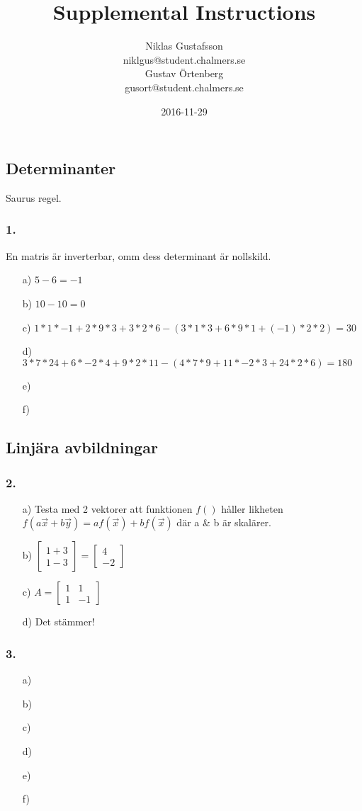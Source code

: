 \documentclass{article}
\title{Supplemental Instructions}
\author{Niklas Gustafsson \\ 
		\small{niklgus@student.chalmers.se} \\
		Gustav Örtenberg \\ 
		\small{gusort@student.chalmers.se}
}
\date{
      2016-11-29
     }
\begin{document}
\maketitle

\subsection*{Determinanter}
Saurus regel.
\subsubsection*{1.}
En matris är inverterbar, omm dess determinant är nollskild.
\begin{itemize}
	\item[a) ] $5-6=-1$
	\item[b) ] $10-10=0$
	\item[c) ] $1*1*-1+2*9*3+3*2*6-(3*1*3+6*9*1+(-1)*2*2)=30$
	\item[d) ] $3*7*24+6*-2*4+9*2*11-(4*7*9+11*-2*3+24*2*6)=180$
	\item[e) ] $  $
	\item[f) ] $  $
\end{itemize}

\subsection*{Linjära avbildningar}
\subsubsection*{2.}
\begin{itemize}
	\item[a) ] Testa med 2 vektorer att funktionen $f()$ håller likheten $f(a\vec{x}+b\vec{y})=af(\vec{x})+bf(\vec{x})$ där a & b är skalärer.
	\item[b) ] $\begin{bmatrix}1+3\\1-3\end{bmatrix}=\begin{bmatrix}4\\-2\end{bmatrix}$
	\item[c) ] $A=\begin{bmatrix}1&1\\1&-1\end{bmatrix}$
	\item[d) ] Det stämmer!
\end{itemize}

\subsubsection*{3.}
\begin{itemize} 
	\item[a) ] 
	\item[b) ]  
	\item[c) ]  
	\item[d) ] 
	\item[e) ] 
	\item[f) ] 
\end{itemize}
\end{document}
